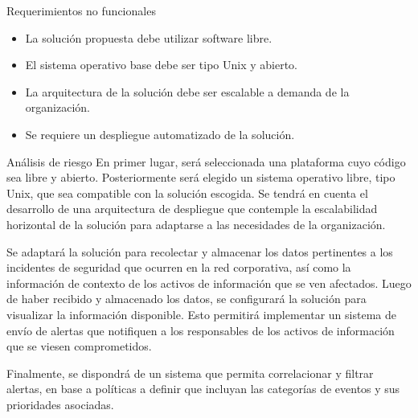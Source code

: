     \begin{section}{Requerimientos no funcionales}
    \begin{itemize}
        \item La solución propuesta debe utilizar software libre.
        \item El sistema operativo base debe ser tipo Unix y abierto.
        \item La arquitectura de la solución debe ser escalable a demanda de la organización.
        \item Se requiere un despliegue automatizado de la solución.
    \end{itemize}
    \end{section}
    
    \begin{section}{Análisis de riesgo}
    En primer lugar, será seleccionada una plataforma cuyo código sea libre y abierto. Posteriormente será elegido un sistema operativo libre, tipo Unix, que sea compatible con la solución escogida. Se tendrá en cuenta el desarrollo de una arquitectura de despliegue que contemple la escalabilidad horizontal de la solución para adaptarse a las necesidades de la organización. \par
    Se adaptará la solución para recolectar y almacenar los datos pertinentes a los incidentes de seguridad que ocurren en la red corporativa, así como la información de contexto de los activos de información que se ven afectados.  Luego de haber recibido y almacenado los datos, se configurará la solución para visualizar la información disponible. Esto permitirá implementar un sistema de envío de alertas que notifiquen a los responsables de los activos de información que se viesen comprometidos. \par
    Finalmente, se dispondrá de un sistema que permita correlacionar y filtrar alertas, en base a políticas a definir que incluyan las categorías de eventos y sus prioridades asociadas.\par
    \end{section}
    
    